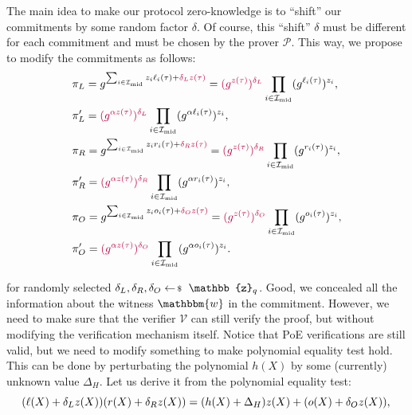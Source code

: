 \documentclass[../lecture-notes-148x210.tex]{subfiles}
\begin{document}
The main idea to make our protocol zero-knowledge is to ``shift'' our commitments by some random factor $\delta$. Of course, this ``shift'' $\delta$ must be different for each commitment and must be chosen by the prover $\mathcal{P}$. This way, we propose to modify the commitments as follows:
\begin{equation*}
    \begin{aligned}
        &\pi_L = g^{\sum_{i \in \mathcal{I}_{\text{mid}}}z_i\ell_i(\tau) + \textcolor{purple}{\delta_Lz(\tau)}} = \textcolor{purple}{(g^{z(\tau)})^{\delta_L}}\prod_{i \in \mathcal{I}_{\text{mid}}}(g^{\ell_i(\tau)})^{z_i}, \\ & \pi_L' = \textcolor{purple}{(g^{\alpha z(\tau)})^{\delta_L}}\prod_{i \in \mathcal{I}_{\text{mid}}}(g^{\alpha \ell_i(\tau)})^{z_i}, \\
        &\pi_R = g^{\sum_{i \in \mathcal{I}_{\text{mid}}}z_ir_i(\tau) + \textcolor{purple}{\delta_Rz(\tau)}} = \textcolor{purple}{(g^{z(\tau)})^{\delta_R}}\prod_{i \in \mathcal{I}_{\text{mid}}}(g^{r_i(\tau)})^{z_i}, \\ & \pi_R' = \textcolor{purple}{(g^{\alpha z(\tau)})^{\delta_R}}\prod_{i \in \mathcal{I}_{\text{mid}}}(g^{\alpha r_i(\tau)})^{z_i}, \\
        &\pi_O = g^{\sum_{i \in \mathcal{I}_{\text{mid}}}z_io_i(\tau) + \textcolor{purple}{\delta_Oz(\tau)}} = \textcolor{purple}{(g^{z(\tau)})^{\delta_O}}\prod_{i \in \mathcal{I}_{\text{mid}}}(g^{o_i(\tau)})^{z_i}, \\ & \pi_O' = \textcolor{purple}{(g^{\alpha z(\tau)})^{\delta_O}}\prod_{i \in \mathcal{I}_{\text{mid}}}(g^{\alpha o_i(\tau)})^{z_i}.
    \end{aligned}
\end{equation*}

for randomly selected $\delta_L, \delta_R, \delta_O \leftarrowS \mathbb{z}_q$. Good, we concealed all the information about the witness $\mathbbm{w}$ in the commitment. However, we need to make sure that the verifier $\mathcal{V}$ can still verify the proof, but without modifying the verification mechanism itself. Notice that PoE verifications are still valid, but we need to modify something to make polynomial equality test hold. This can be done by perturbating the polynomial $h(X)$ by some (currently) unknown value $\Delta_H$. Let us derive it from the polynomial equality test:
\begin{equation*}
    (\ell(X) + \delta_L z(X))(r(X) + \delta_R z(X)) = (h(X) + \Delta_H)z(X) + (o(X) + \delta_O z(X)), \\
\end{equation*}
\end{document}

